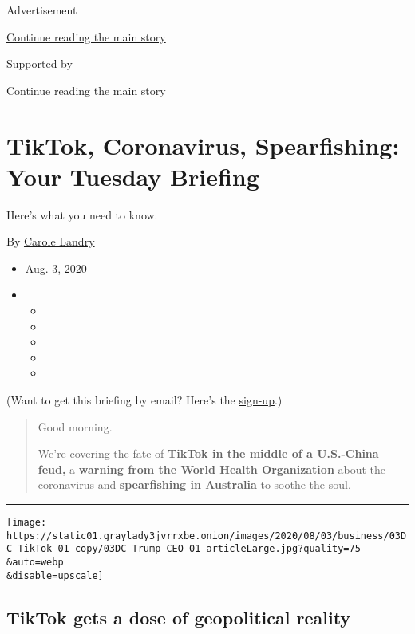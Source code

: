 Advertisement

\protect\hyperlink{after-top}{Continue reading the main story}

Supported by

\protect\hyperlink{after-sponsor}{Continue reading the main story}

\hypertarget{tiktok-coronavirus-spearfishing-your-tuesday-briefing}{%
\section{TikTok, Coronavirus, Spearfishing: Your Tuesday
Briefing}\label{tiktok-coronavirus-spearfishing-your-tuesday-briefing}}

Here's what you need to know.

By \href{https://www.nytimes3xbfgragh.onion/by/carole-landry}{Carole
Landry}

\begin{itemize}
\item
  Aug. 3, 2020
\item
  \begin{itemize}
  \item
  \item
  \item
  \item
  \item
  \end{itemize}
\end{itemize}

(Want to get this briefing by email? Here's the
\href{https://www.nytimes3xbfgragh.onion/morning-briefing}{sign-up}.)

\begin{quote}
Good morning.

We're covering the fate of \textbf{TikTok in the middle of a U.S.-China
feud,} a \textbf{warning from the World Health Organization} about the
coronavirus and \textbf{spearfishing in Australia} to soothe the soul.
\end{quote}

\begin{center}\rule{0.5\linewidth}{\linethickness}\end{center}

\texttt{[image: https://static01.graylady3jvrrxbe.onion/images/2020/08/03/business/03DC-TikTok-01-copy/03DC-Trump-CEO-01-articleLarge.jpg?quality=75\\\&auto=webp\\\&disable=upscale]}

\hypertarget{tiktok-gets-a-dose-of-geopolitical-reality}{%
\subsection{TikTok gets a dose of geopolitical
reality}\label{tiktok-gets-a-dose-of-geopolitical-reality}}

